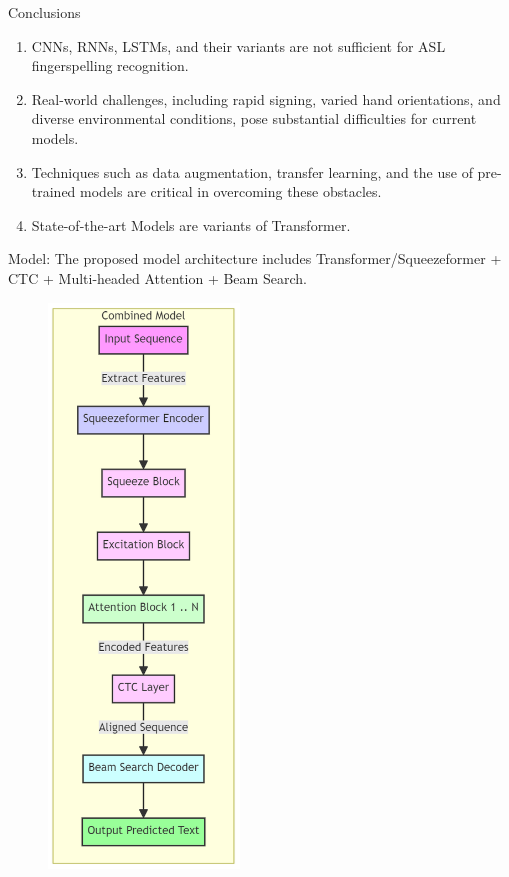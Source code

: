 \documentclass[xcolor={cmyk}]{beamer} %
\begin{document}
\begin{frame}[t]
\begin{columns}[t]
\begin{column}{0.3\textwidth}
			\begin{block}{Conclusions}
				\begin{minipage}{0.75\linewidth}
					\begin{enumerate}
						\item CNNs, RNNs, LSTMs, and their variants are not sufficient for ASL fingerspelling recognition.
						\item Real-world challenges, including rapid signing, varied hand orientations, and diverse environmental conditions, pose substantial difficulties for current models.
						\item Techniques such as data augmentation, transfer learning, and the use of pre-trained models are critical in overcoming these obstacles.
						\item State-of-the-art Models are variants of Transformer.
					\end{enumerate}
					\alert{Model}: The proposed model architecture includes Transformer/Squeezeformer + CTC + Multi-headed Attention + Beam Search.
				\end{minipage}
				\hfill
				\begin{minipage}{0.24\linewidth}
					\begin{figure}
						\includegraphics[width=2in]{mermaid-diagram-conclusion.png}
					\end{figure}
				\end{minipage}
			\end{block}


\end{column}
\end{columns}
\end{frame}
\end{document}
